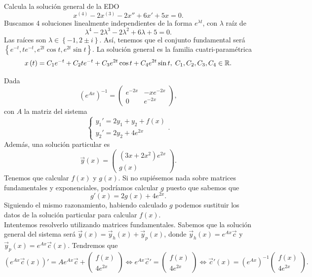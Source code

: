 \begin{eg}
Calcula la solución general de la EDO
\[x^{\left(4\right)}-2x^{\left(3\right)} - 2x'' + 6x' + 5x = 0 .\]
Buscamos 4 soluciones linealmente independientes de la forma $\displaystyle e^{\lambda t} $, con $\displaystyle \lambda  $ raíz de
\[\lambda^{4} - 2\lambda^{3} - 2\lambda^{2}+6\lambda + 5 = 0 .\]
Las raíces son $\displaystyle \lambda \in \left\{ -1, 2 \pm i\right\}  $. Así, tenemos que el conjunto fundamental será $\displaystyle \left\{ e^{-t}, te^{-t}, e^{2t}\cos t, e^{2t}\sin t\right\}  $. La solución general es la familia cuatri-paramétrica
\[x\left(t\right)=C_{1}e^{-t} + C_{2}te^{-t} + C_{3}e^{2t}\cos t + C_{4}e^{2t}\sin t, \; C_{1}, C_{2}, C_{3}, C_{4} \in \mathbb{R} .\]
\end{eg}
\begin{eg}
Dada 
\[\left(e^{Ax}\right)^{-1}=\begin{pmatrix} e^{-2x} & -xe^{-2x} \\ 0 & e^{-2x}\end{pmatrix} ,\]
con $\displaystyle A $ la matriz del sistema 
\[
\begin{cases}
y_{1}'= 2y_{1} + y_{2}+f\left(x\right) \\
y_{2}' = 2y_{2} + 4e^{2x}
\end{cases}
.\]
Además, una solución particular es 
\[\vec{y}\left(x\right)=\begin{pmatrix} \left(3x + 2x^{2}\right)e^{2x} \\ g\left(x\right) \end{pmatrix} .\]
Tenemos que calcular $\displaystyle f\left(x\right) $ y $\displaystyle g\left(x\right) $. Si no supiésemos nada sobre matrices fundamentales y exponenciales, podríamos calcular $\displaystyle g $ puesto que sabemos que 
\[g'\left(x\right)=2g\left(x\right) + 4e^{2x} .\]
Siguiendo el mismo razonamiento, habiendo calculado $\displaystyle g $ podemos sustituir los datos de la solución particular para calcular $\displaystyle f\left(x\right) $. \\
Intentemos resolverlo utilizando matrices fundamentales. Sabemos que la solución general del sistema será $\displaystyle \vec{y}\left(x\right)=\vec{y}_{h}\left(x\right) + \vec{y}_{p}\left(x\right) $, donde $\displaystyle \vec{y}_{h}\left(x\right)=e^{Ax}\vec{c} $ y $\displaystyle \vec{y}_{p}\left(x\right)=e^{Ax}\vec{c}\left(x\right) $. 
Tendremos que 
\[\left(e^{Ax}\vec{c}\left(x\right)\right)' = Ae^{Ax}\vec{c} + \begin{pmatrix} f\left(x\right) \\ 4e^{2x} \end{pmatrix} \iff e^{Ax}\vec{c}' = \begin{pmatrix} f\left(x\right) \\ 4e^{2x} \end{pmatrix}\iff \vec{c}'\left(x\right)=\left(e^{Ax}\right)^{-1}\begin{pmatrix} f\left(x\right) \\ 4e^{2x} \end{pmatrix} .\]

\end{eg}
